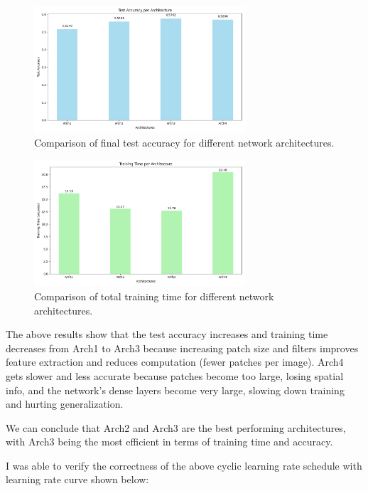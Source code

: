 \documentclass[11pt]{article}
\begin{document}
\begin{figure}[H]
    \centering
    \includegraphics[width=0.7\textwidth]{results/architecture_test_accuracy.png}
    \caption{Comparison of final test accuracy for different network architectures.}
    \label{fig:network_architecture_acc_comparison}
\end{figure}

\begin{figure}[H]
  \centering
  \includegraphics[width=0.7\textwidth]{results/architecture_training_time.png}
  \caption{Comparison of total training time for different network architectures.}
  \label{fig:network_architecture_training_time_comparison}
\end{figure}

The above results show that the test accuracy increases and training time decreases from Arch1 to Arch3 because increasing patch size and filters improves feature extraction and reduces computation (fewer patches per image).
Arch4 gets slower and less accurate because patches become too large, losing spatial info, and the network's dense layers become very large, slowing down training and hurting generalization.

We can conclude that Arch2 and Arch3 are the best performing architectures, with Arch3 being the most efficient in terms of training time and accuracy.

I was able to verify the correctness of the above cyclic learning rate schedule with learning rate curve shown below:
\end{document}
